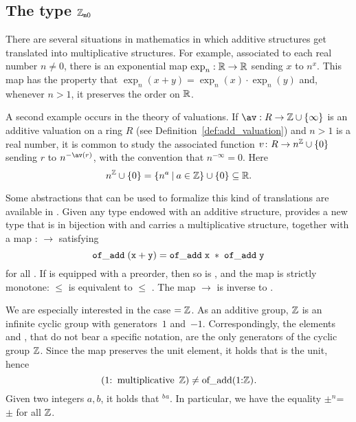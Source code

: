 \documentclass[sigplan,10pt,anonymous,review]{acmart}
\begin{document}
\subsection{\texorpdfstring{The type $\mathbb{Z}_{\mathtt{m}0}$}{The type with\_zero multiplicative Z}}\label{subsection:wzmZZ}
There are several situations in mathematics in which additive structures get translated into multiplicative structures. For example, associated to each real number $n \ne 0$, there is an exponential map $\exp_n : \mathbb{R} \to \mathbb{R}$ sending $x$ to $n^x$. This map has the property that
$\exp_n(x + y) = \exp_n(x) \cdot \exp_n(y)$ and, whenever $n > 1$, it preserves the order on $\mathbb{R}$.

A second example occurs in the theory of valuations. If $\av : R \to \ZZ \cup \{\infty\}$ is an additive valuation on a ring $R$ (see Definition~\ref{def:add_valuation}) and $n > 1$ is a real number, it is common to study the associated function $v \colon R \rightarrow n^{\mathbb{Z}} \cup \{0\}$ sending $r$ to $n^{-\av(r)}$, with the convention that $n^{-\infty} = 0$. Here
\[ n^{\mathbb{Z}} \cup \{0\}=\{n^a \:\vert\: a \in \mathbb{Z}\} \cup \{0\}\subseteq \mathbb{R}. \]

Some abstractions that can be used to formalize this kind of translations are available in \mathlib. Given any type  endowed with an additive structure, \mathlib provides a new type  that is in bijection with  and carries a multiplicative structure, together with a map
 :  $\rightarrow$  satisfying
\[
    \mathtt{\ of\_add\; (x + y) = of\_add\; x\; *\; of\_add\; y\ }
\]
for all . If  is equipped with a preorder, then so is , and the map  is strictly monotone:  $\le$  is equivalent to  $\le$ . The map  $\to$  is inverse to .

We are especially interested in the case  $= \mathbb{Z}$. As an additive group, $\mathbb{Z}$ is an infinite cyclic group with generators~$1$ and~$-1$. Correspondingly, the elements  and , that do not bear a specific notation, are the only generators of the cyclic group \;$\mathbb{Z}$. Since the map  preserves the unit element, it holds that  is the unit, hence
\[
\text{\code{(1:}}\;\text{\code{multiplicative} }\ZZ)\neq\text{\code{of_add(1:}}\ZZ\text{\code{)}}.
\]
Given two integers $a, b$, it holds that $^b$$^a$. In particular, we have the equality $\pm$$^n$= $\pm$ for all  $\mathbb{Z}$.
\end{document}

